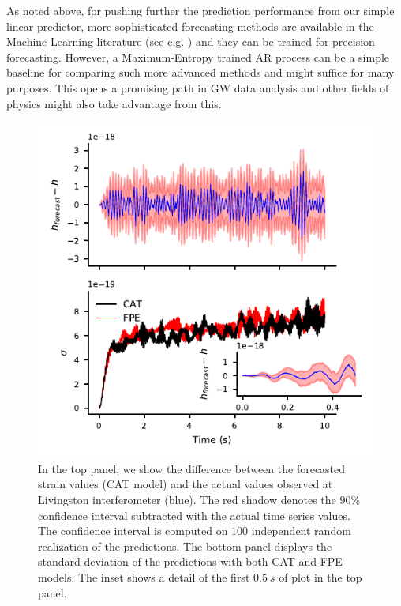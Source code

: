\documentclass{aa}
\begin{document}
As noted above, for pushing further the prediction performance from our simple linear predictor, more sophisticated forecasting methods are available in the Machine Learning literature (see e.g. \cite{LSTM_article, oord2016wavenet}) and they can be trained for precision forecasting. However, a Maximum-Entropy trained AR process can be a simple baseline for comparing such more advanced methods and might suffice for many purposes.
This opens a promising path in GW data analysis and other fields of physics might also take advantage from this.

\begin{figure}
	\caption{In the top panel, we show the difference between the forecasted strain values (CAT model) and the actual values observed at Livingston interferometer (blue). The red shadow denotes the $90\%$ confidence interval subtracted with the actual time series values. The confidence interval is computed on  $100$ independent random realization of the predictions.
	The bottom panel displays the standard deviation of the predictions with both CAT and FPE models. The inset shows a detail of the first $\SI{0.5}{s}$ of plot in the top panel.
	}
	\label{fig:LIGO_forecast}
	\includegraphics{Images/forecast_LIGO/forecast_accuracy.pdf}
\end{figure}
\end{document}
